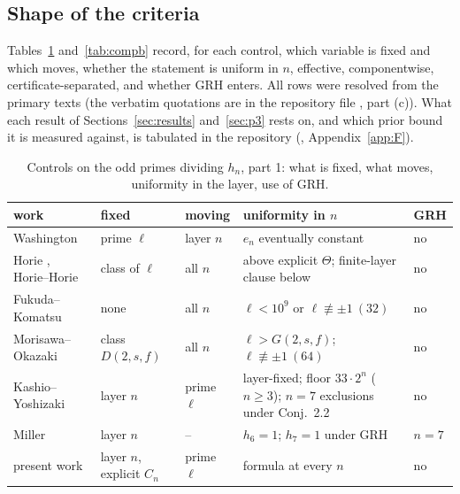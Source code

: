 \documentclass[11pt]{amsart}
\theoremstyle{remark}\newtheorem{remark}[theorem]{Remark}
\theoremstyle{definition}\newtheorem{definition}[theorem]{Definition}
\theoremstyle{definition}\newtheorem{algorithm}[theorem]{Algorithm}
\begin{document}
\subsection{Shape of the criteria}\label{sec:comp}%
Tables~\ref{tab:comp} and~\ref{tab:compb} record, for each control, which variable is fixed and which moves, whether the statement is uniform in $n$, effective, componentwise, certificate-separated, and whether GRH enters. All rows were resolved from the primary texts (the verbatim quotations are in the repository file , part (c)). What each result of Sections~\ref{sec:results} and~\ref{sec:p3} rests on, and which prior bound it is measured against, is tabulated in the repository (\artNovelty{}, Appendix~\ref{app:F}).
\begin{table}[h]\footnotesize
\begin{tabular}{@{}p{3.0cm}p{1.7cm}p{1.5cm}p{3.6cm}p{1.1cm}@{}}\toprule
work & fixed & moving & uniformity in $n$ & GRH\\ \midrule
Washington \cite{Wa75,Wa78} & prime $\ell$ & layer $n$ & $e_n$ eventually constant & no\\
Horie \cite{Ho05,Ho07}, Horie--Horie \cite{HH09} & class of $\ell$ & all $n$ & above explicit $\Theta$; finite-layer clause below & no\\
Fukuda--Komatsu \cite{FK3} & none & all $n$ & $\ell<10^9$ or $\ell\not\equiv\pm1\ (32)$ & no\\
Morisawa--Okazaki \cite{MO16} & class $D(2,s,f)$ & all $n$ & $\ell>G(2,s,f)$; $\ell\not\equiv\pm1\ (64)$ & no\\
Kashio--Yoshizaki \cite{KY} & layer $n$ & prime $\ell$ & layer-fixed; floor $33\cdot2^n$ ($n\ge3$); $n=7$ exclusions under Conj.~2.2 & no\\
Miller \cite{Mi} & layer $n$ & -- & $h_6=1$; $h_7=1$ under GRH & $n=7$\\
present work & layer $n$, explicit $C_n$ & prime $\ell$ & formula at every $n$ & no\\
\bottomrule\end{tabular}
\caption{Controls on the odd primes dividing $h_n$, part 1: what is fixed, what moves, uniformity in the layer, use of GRH.}\label{tab:comp}
\end{table}
\end{document}
